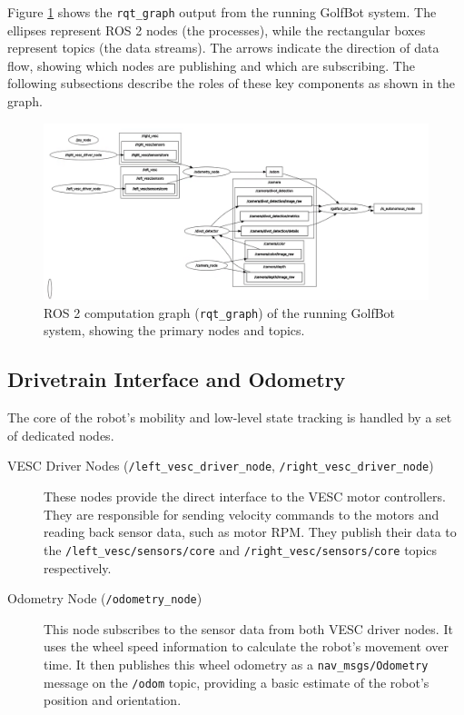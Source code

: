 Figure \ref{fig:ros2_computation_graph} shows the \texttt{rqt\_graph} output from the running GolfBot system. The ellipses represent ROS 2 nodes (the processes), while the rectangular boxes represent topics (the data streams). The arrows indicate the direction of data flow, showing which nodes are publishing and which are subscribing. The following subsections describe the roles of these key components as shown in the graph.

\begin{figure}[h!]
    \centering
    \includegraphics[width=\linewidth]{figures/ros2_nodes.png}
    \caption{ROS 2 computation graph (\texttt{rqt\_graph}) of the running GolfBot system, showing the primary nodes and topics.}
    \label{fig:ros2_computation_graph}
\end{figure}

\subsection{Drivetrain Interface and Odometry}
The core of the robot's mobility and low-level state tracking is handled by a set of dedicated nodes.
\begin{description}
    \item[VESC Driver Nodes (\texttt{/left\_vesc\_driver\_node}, \texttt{/right\_vesc\_driver\_node})] These nodes provide the direct interface to the VESC motor controllers. They are responsible for sending velocity commands to the motors and reading back sensor data, such as motor RPM. They publish their data to the \texttt{/left\_vesc/sensors/core} and \texttt{/right\_vesc/sensors/core} topics respectively.
    \item[Odometry Node (\texttt{/odometry\_node})] This node subscribes to the sensor data from both VESC driver nodes. It uses the wheel speed information to calculate the robot's movement over time. It then publishes this wheel odometry as a \texttt{nav\_msgs/Odometry} message on the \texttt{/odom} topic, providing a basic estimate of the robot's position and orientation.
\end{description}


